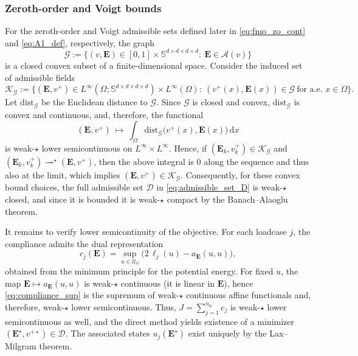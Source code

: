 \documentclass[preprint,3p]{elsarticle}
\newcommand{\tens}[1]{\bm{\mathit{#1}}}             %
\newcommand{\tensf}[1]{\bm{\mathbf{#1}}}            %
\newcommand{\nlc}{n_\mathrm{lc}}                    %
\begin{document}
\subsubsection{Zeroth-order and Voigt bounds}
For the zeroth-order and Voigt admissible sets defined later in \eqref{eq:fmo_zo_cont} and \eqref{eq:A1_def}, respectively, the graph
%
\begin{equation}
\mathcal{G}:=\{(v,\tensf{E})\in[0,1]\times \mathbb{S}^{d\times d\times d\times d}:\ \tensf{E}\in\mathcal{A}(v)\}
\end{equation}
%
is a closed convex subset of a finite-dimensional space. Consider the induced set of admissible fields
%
\begin{equation}\label{eq:K_G}
\mathcal{K}_{\mathcal{G}}
:=\big\{(\tensf{E},v^+)\in L^\infty(\Omega;\mathbb{S}^{d\times d\times d\times d})\times L^\infty(\Omega):\
(v^+(\tens{x}),\tensf{E}(\tens{x}))\in\mathcal{G}\ \text{for a.e. }\tens{x}\in\Omega\big\}.
\end{equation}
%
Let $\mathrm{dist}_{\mathcal{G}}$ be the Euclidean distance to $\mathcal{G}$. Since $\mathcal{G}$ is closed and convex, $\mathrm{dist}_{\mathcal{G}}$ is convex and continuous, and, therefore, the functional
%
\begin{equation}
(\tensf{E},v^+) \ \mapsto\ \int_\Omega \mathrm{dist}_{\mathcal{G}}\big(v^+(\tens{x}),\tensf{E}(\tens{x})\big)\,\mathrm{d}\tens{x}
\end{equation}
%
is weak-$\star$ lower semicontinuous on $L^\infty\times L^\infty$. Hence, if $(\tensf{E}_k,v_k^+)\in \mathcal{K}_{\mathcal{G}}$ and $(\tensf{E}_k,v_k^+)\rightharpoonup^\star(\tensf{E},v^+)$, then the above integral is $0$ along the sequence and thus also at the limit, which implies $(\tensf{E},v^+)\in\mathcal{K}_{\mathcal{G}}$. Consequently, for these convex bound choices, the full admissible set $\mathcal{D}$ in \eqref{eq:admissible_set_D} is weak-$\star$ closed, and since it is bounded it is weak-$\star$ compact by the Banach--Alaoglu theorem.

It remains to verify lower semicontinuity of the objective. For each loadcase $j$, the compliance admits the dual representation
%
\begin{equation}\label{eq:compliance_sup}
c_j(\tensf{E})=\sup_{\tens{u}\in\mathcal{U}_0}\Big(2\,\ell_j(\tens{u})-a_{\tensf{E}}(\tens{u},\tens{u})\Big),
\end{equation}
%
obtained from the minimum principle for the potential energy. For fixed $\tens{u}$, the map $\tensf{E}\mapsto a_{\tensf{E}}(\tens{u},\tens{u})$ is weak-$\star$ continuous (it is linear in $\tensf{E}$), hence \eqref{eq:compliance_sup} is the supremum of weak-$\star$ continuous affine functionals and, therefore, weak-$\star$ lower semicontinuous. Thus, $J=\sum_{j=1}^{\nlc}c_j$ is weak-$\star$ lower semicontinuous as well, and the direct method yields existence of a minimizer $(\tensf{E}^\star,v^{+\star})\in\mathcal{D}$. The associated states $\tens{u}_j(\tensf{E}^\star)$ exist uniquely by the Lax--Milgram theorem.
\end{document}
